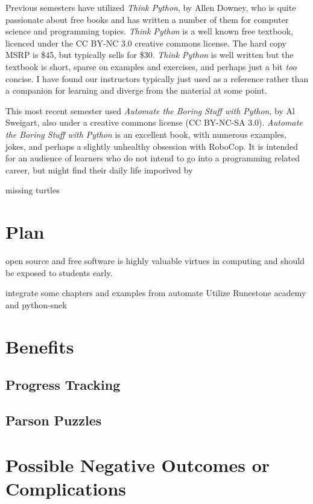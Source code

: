 \documentclass[]{article}
\begin{document}
Previous semesters have utilized \textit{Think Python}, by Allen Downey, who is quite passionate about free books and has written a number of them for computer science and programming topics.
\textit{Think Python} is a well known free textbook, licenced under the CC BY-NC 3.0 creative commons license.  The hard copy MSRP is  \$45, but typically sells for \$30.
\textit{Think Python} is well written but the textbook is short, sparse on examples and exercises, and perhaps just a bit \textit{too} concise.
I have found our instructors typically just used as a reference rather than a companion for learning and diverge from the material at some point.

This most recent semester used \textit{Automate the Boring Stuff with Python}, by Al Sweigart, also under a creative commons license (CC BY-NC-SA 3.0).
\textit{Automate the Boring Stuff with Python} is an excellent book, with numerous examples, jokes, and perhaps a slightly unhealthy obsession with RoboCop.
It is intended for an audience of learners who do not intend to go into a programming related career, but might find their daily life imporived by 

missing turtles

\section{Plan}
open source and free software is highly valuable virtues in computing and should be exposed to students early.

integrate some chapters and examples from automate 
Utilize Runestone academy and python-snek

\section{Benefits}

\subsection{Progress Tracking}

\subsection{Parson Puzzles}



\section{Possible Negative Outcomes or Complications}
\end{document}

